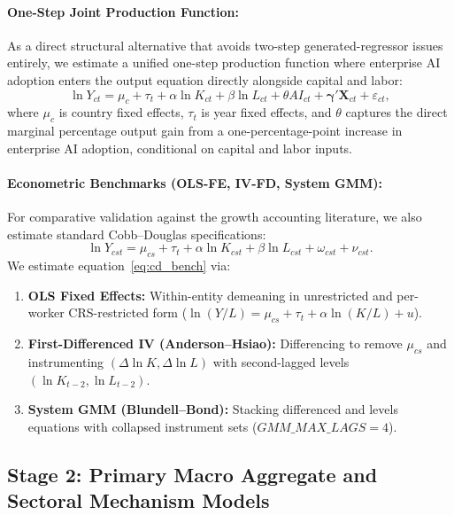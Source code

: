 \documentclass[11pt,a4paper]{article}
\begin{document}
\paragraph{One-Step Joint Production Function:}
As a direct structural alternative that avoids two-step generated-regressor issues entirely, we estimate a unified one-step production function where enterprise AI adoption enters the output equation directly alongside capital and labor:
\begin{equation}
    \ln Y_{ct} = \mu_c + \tau_t + \alpha \ln K_{ct} + \beta \ln L_{ct} + \theta AI_{ct} + \bm{\gamma}' \mathbf{X}_{ct} + \varepsilon_{ct},
    \label{eq:onestep}
\end{equation}
where $\mu_c$ is country fixed effects, $\tau_t$ is year fixed effects, and $\theta$ captures the direct marginal percentage output gain from a one-percentage-point increase in enterprise AI adoption, conditional on capital and labor inputs.

\paragraph{Econometric Benchmarks (OLS-FE, IV-FD, System GMM):}
For comparative validation against the growth accounting literature, we also estimate standard Cobb--Douglas specifications:
\begin{equation}
    \ln Y_{cst} = \mu_{cs} + \tau_t + \alpha \ln K_{cst} + \beta \ln L_{cst} + \omega_{cst} + \nu_{cst}.
    \label{eq:cd_bench}
\end{equation}
We estimate equation~\eqref{eq:cd_bench} via:
\begin{enumerate}
    \item \textbf{OLS Fixed Effects:} Within-entity demeaning in unrestricted and per-worker CRS-restricted form ($\ln(Y/L) = \mu_{cs} + \tau_t + \alpha \ln(K/L) + u$).
    \item \textbf{First-Differenced IV (Anderson--Hsiao):} Differencing to remove $\mu_{cs}$ and instrumenting $(\Delta \ln K, \Delta \ln L)$ with second-lagged levels $(\ln K_{t-2}, \ln L_{t-2})$.
    \item \textbf{System GMM (Blundell--Bond):} Stacking differenced and levels equations with collapsed instrument sets ($GMM\_MAX\_LAGS = 4$).
\end{enumerate}

\subsection{Stage 2: Primary Macro Aggregate and Sectoral Mechanism Models}
\end{document}
